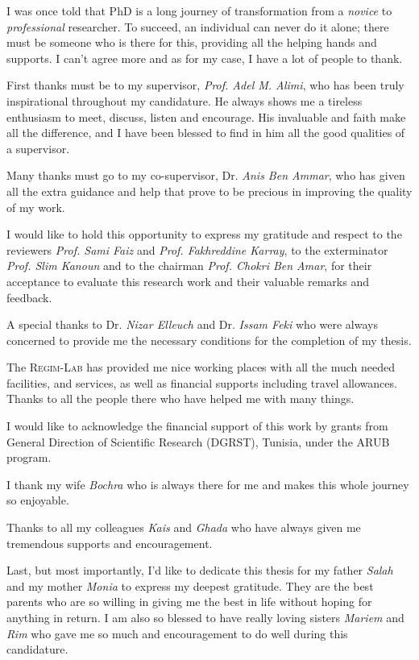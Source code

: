 \begin{remerciements}

I was once told that PhD is a long journey of transformation from a \emph{novice} to \emph{professional} researcher. To succeed, an individual can never do it alone; there must be someone who is there for this, providing all the helping hands and supports. I can’t agree more\revAnglais{,} and as for my case, I have a lot of people to thank.

First thanks must be to my supervisor, \emph{Prof. Adel M. Alimi}, who has been truly inspirational throughout my candidature. He always shows me a tireless enthusiasm to meet, discuss, listen and encourage. His invaluable  and faith make all the difference, and I have been blessed to find in him all the good qualities of a supervisor.  

Many thanks must go to my co-supervisor, Dr. \emph{Anis Ben Ammar}, who has given all the extra guidance and help that prove to be precious in improving the quality of my work. 

I would like to hold this opportunity to express my gratitude and respect to the reviewers \textit{Prof. Sami Faiz} and \textit{Prof. Fakhreddine Karray}, to the exterminator \textit{Prof. Slim Kanoun} and to the chairman \textit{Prof. Chokri Ben Amar}, for their acceptance to evaluate this research work and their valuable remarks and feedback.


A special thanks to Dr. \textit{Nizar Elleuch} and Dr. \textit{Issam Feki} who were always concerned to provide me the necessary conditions for the completion of my thesis.

The \textsc{Regim-Lab} has provided me nice working places with all the much needed facilities, and services, as well as financial supports including travel allowances. Thanks to all the people there who have helped me with many things. 

I would like to acknowledge the financial support of this work by grants 
from General Direction of Scientific Research (DGRST), Tunisia, under the ARUB program.

I thank my wife \emph{Bochra} who is always there for me and makes this whole journey so enjoyable. 

Thanks to all my colleagues \emph{Kais} and \emph{Ghada} who have always given me tremendous supports and encouragement. 

Last, but most importantly, I’d like to dedicate this thesis for my father \emph{Salah} and my mother \emph{Monia} to express my deepest gratitude. They are the best parents who are so willing in giving me the best in life without hoping for anything in return. I am also so blessed to have  really loving sisters \emph{Mariem} and \emph{Rim} who gave me so much  and encouragement to do well during this candidature.


\end{remerciements}
